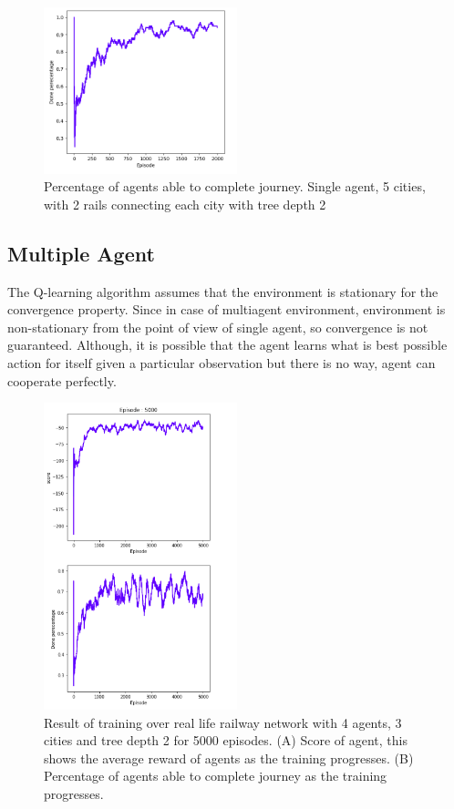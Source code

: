 \begin{figure}[h]
    \centering
    \includegraphics[width=0.5\textwidth]{single_agent_tree_observation_depth2}
    \caption{ Percentage of agents able to complete journey. Single agent, 5 cities, with 2 rails 
    connecting each city with tree depth 2 }
    \label{result10}
\end{figure}

\subsection{Multiple Agent}
The Q-learning algorithm assumes that the environment is stationary for the convergence property. Since in case of multiagent 
environment, environment is non-stationary from the point of view of single agent, so convergence is not guaranteed. 
Although, it is possible that the agent learns what is best possible action for itself given a particular observation but there 
is no way, agent can cooperate perfectly. 

\begin{figure}[H]
    \centering
    \includegraphics[width=0.5\textwidth]{agent4_city_3_multi}
    \caption{Result of training over real life railway network with 4 agents, 3 cities and tree depth 2 for 5000 episodes. 
        (A) Score of agent, this shows the average reward of agents as the training progresses. 
        (B) Percentage of agents able to complete journey as the training progresses. }
    \label{result10}
\end{figure}

